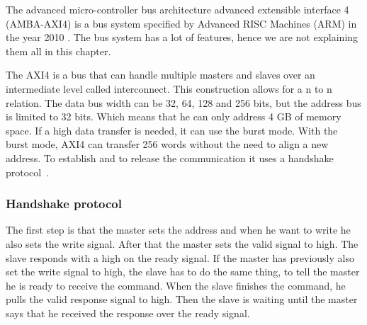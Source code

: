 The advanced micro-controller bus architecture advanced extensible interface 4 (AMBA-AXI4) is a bus system specified by Advanced RISC Machines (ARM) in the year 2010 \cite{6129797}. The bus system has a lot of features, hence we are not explaining them all in this chapter.

The AXI4 is a bus that can handle multiple masters and slaves over an intermediate level called interconnect. This construction allows for a n to n relation. The data bus width can be 32, 64, 128 and 256 bits, but the address bus is limited to 32 bits. Which means that he can only address 4 GB of memory space. If a high data transfer is needed, it can use the burst mode. With the burst mode, AXI4 can transfer 256 words without the need to align a new address. To establish and to release the communication it uses a handshake protocol~\cite{ARMLimited2019}. 

\subsubsection{Handshake protocol}
The first step is that the master sets the address and when he want to write he also sets the write signal. After that the master sets the valid signal to high. The slave responds with a high on the ready signal. If the master has previously also set the write signal to high, the slave has to do the same thing, to tell the master he is ready to receive the command. When the slave finishes the command, he pulls the valid response signal to high. Then the slave is waiting until the master says that he received the response over the ready signal.


